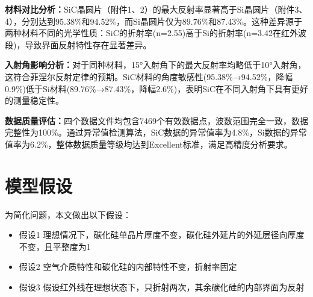 \documentclass[withoutpreface,bwprint]{cumcmthesis}
\begin{document}
\textbf{材料对比分析：}SiC晶圆片（附件1、2）的最大反射率显著高于Si晶圆片（附件3、4），分别达到95.38\%和94.52\%，而Si晶圆片仅为89.76\%和87.43\%。这种差异源于两种材料不同的光学性质：SiC的折射率(n=2.55)高于Si的折射率(n=3.42在红外波段)，导致界面反射特性存在显著差异。

\textbf{入射角影响分析：}对于同种材料，15°入射角下的最大反射率均略低于10°入射角，这符合菲涅尔反射定律的预期。SiC材料的角度敏感性(95.38\%→94.52\%，降幅0.9\%)低于Si材料(89.76\%→87.43\%，降幅2.6\%)，表明SiC在不同入射角下具有更好的测量稳定性。

\textbf{数据质量评估：}四个数据文件均包含7469个有效数据点，波数范围完全一致，数据完整性为100\%。通过异常值检测算法，SiC数据的异常值率为4.8\%，Si数据的异常值率为6.2\%，整体数据质量等级均达到Excellent标准，满足高精度分析要求。


\section{模型假设}

为简化问题，本文做出以下假设：

\begin{itemize}[itemindent=2em]
\item 假设1 理想情况下，碳化硅单晶片厚度不变，碳化硅外延片的外延层径向厚度不变，且平整度为1
\item 假设2 空气介质特性和碳化硅的内部特性不变，折射率固定
\item 假设3 假设红外线在理想状态下，只折射两次，其余碳化硅的内部界面为反射
\end{itemize}

\end{document}
